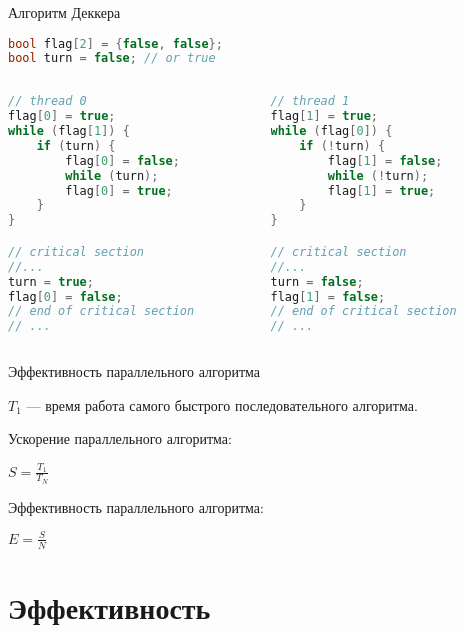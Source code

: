 \begin{frame}[fragile]{Алгоритм Деккера}

\begin{lstlisting}[language=C++,basicstyle=\ttfamily,keywordstyle=\color{blue},basicstyle=\scriptsize]
bool flag[2] = {false, false};
bool turn = false; // or true
\end{lstlisting}

\begin{columns}[t]
    \begin{column}[T]{0.45\textwidth}
        \begin{lstlisting}[language=C++,basicstyle=\ttfamily,keywordstyle=\color{blue},basicstyle=\scriptsize]
// thread 0
flag[0] = true;
while (flag[1]) {
    if (turn) {
        flag[0] = false;
        while (turn);
        flag[0] = true;
    }
}

// critical section
//...
turn = true;
flag[0] = false;
// end of critical section
// ...
        \end{lstlisting}
    \end{column}
    \begin{column}[T]{0.45\textwidth}
        \begin{lstlisting}[language=C++,basicstyle=\ttfamily,keywordstyle=\color{blue},basicstyle=\scriptsize]
// thread 1
flag[1] = true;
while (flag[0]) {
    if (!turn) {
        flag[1] = false;
        while (!turn);
        flag[1] = true;
    }
}

// critical section
//...
turn = false;
flag[1] = false;
// end of critical section
// ...
        \end{lstlisting}
    \end{column}
\end{columns}

\end{frame}

\begin{frame}{Эффективность параллельного алгоритма}

$T_1$ --- время работа самого быстрого последовательного алгоритма.

Ускорение параллельного алгоритма:

$S = \frac{T_1}{T_N}$

Эффективность параллельного алгоритма:

$E = \frac{S}{N}$

\end{frame}

\section{Эффективность}

